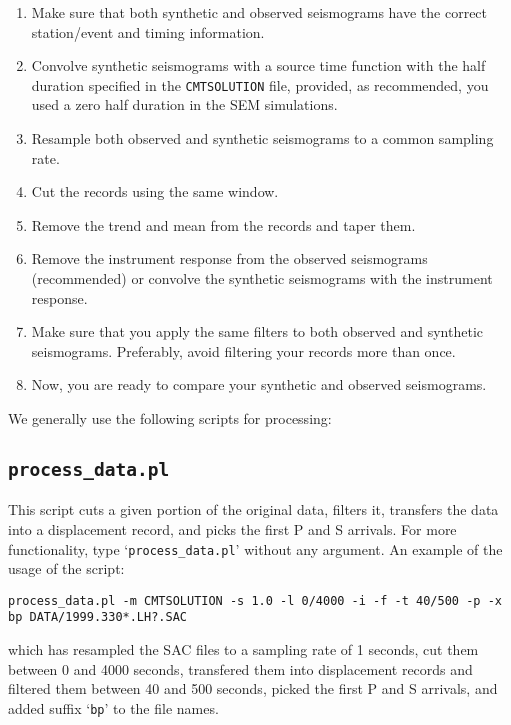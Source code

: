 \begin{enumerate}
\item Make sure that both synthetic and observed seismograms have the correct station/event and timing information.
\item Convolve synthetic seismograms with a source time function with the half duration specified in the \texttt{CMTSOLUTION} file, provided, as recommended, you used a zero half duration in the SEM simulations.
\item Resample both observed and synthetic seismograms to a common sampling rate.
\item Cut the records using the same window.
\item Remove the trend and mean from the records and taper them.
\item Remove the instrument response from the observed seismograms (recommended) or convolve the synthetic seismograms with the instrument response.
\item Make sure that you apply the same filters to both observed and synthetic seismograms. Preferably, avoid filtering your records more than once.
\item Now, you are ready to compare your synthetic and observed seismograms.
\end{enumerate}

We generally use the following scripts for processing:

\subsection{\texttt{process\_data.pl}}

This script cuts a given portion of the original data, filters it,
transfers the data into a displacement record, and picks the first
P and S arrivals. For more functionality, type `\texttt{process\_data.pl}'
without any argument. An example of the usage of the script:

{\footnotesize
\begin{verbatim}
process_data.pl -m CMTSOLUTION -s 1.0 -l 0/4000 -i -f -t 40/500 -p -x bp DATA/1999.330*.LH?.SAC
\end{verbatim}
}

\noindent
which has resampled the SAC files to a sampling rate of 1 seconds, cut them between 0 and 4000 seconds, transfered them into displacement
records and filtered them between 40 and 500 seconds, picked the first P and S arrivals, and added suffix `\texttt{bp}' to the file names.

